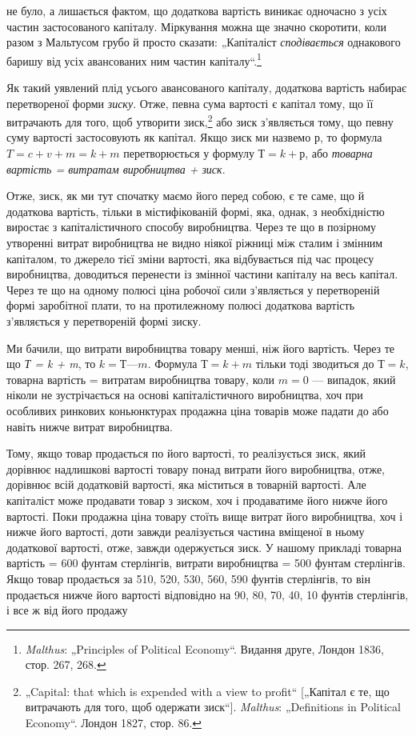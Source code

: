 \parcont{}  %
не було, а лишається фактом, що додаткова вартість виникає одночасно
з усіх частин застосованого капіталу. Міркування можна
ще значно скоротити, коли разом з Мальтусом грубо й просто
сказати: „Капіталіст \emph{сподівається} однакового баришу від усіх
авансованих ним частин капіталу“.\footnote{
\emph{Malthus}: „Principles of Political Economy“. Видання друге, Лондон 1836,
стор. 267, 268.
}

Як такий уявлений плід усього авансованого капіталу, додаткова
вартість набирає перетвореної форми \emph{зиску}. Отже, певна
сума вартості є капітал тому, що її витрачають для того, щоб
утворити зиск,\footnote{
„Capital: that which is expended with a view to profit“ [„Капітал є те, що
витрачають для того, щоб одержати зиск“]. \emph{Malthus}: „Definitions in Political
Economy“. Лондон 1827, стор. 86.
} або зиск з’являється тому, що певну суму вартості
застосовують як капітал. Якщо зиск ми назвемо $р$, то формула
$T = c + v + m = k + m$ перетворюється у формулу $Т = k + р$, або
\emph{товарна вартість = витратам виробництва + зиск}.

Отже, зиск, як ми тут спочатку маємо його перед собою,
є те саме, що й додаткова вартість, тільки в містифікованій
формі, яка, однак, з необхідністю виростає з капіталістичного
способу виробництва. Через те що в позірному утворенні витрат
виробництва не видно ніякої ріжниці між сталим і змінним
капіталом, то джерело тієї зміни вартості, яка відбувається
під час процесу виробництва, доводиться перенести із змінної
частини капіталу на весь капітал. Через те що на одному полюсі
ціна робочої сили з’являється у перетвореній формі заробітної
плати, то на протилежному полюсі додаткова вартість з’являється
у перетвореній формі зиску.

Ми бачили, що витрати виробництва товару менші, ніж його
вартість. Через те що \emph{Т = k + m}, то $k = Т — m$. Формула
$Т = k + m$ тільки тоді зводиться до $Т = k$, товарна вартість =
витратам виробництва товару, коли $m = 0$ — випадок, який
ніколи не зустрічається на основі капіталістичного виробництва,
хоч при особливих ринкових коньюнктурах продажна ціна товарів
може падати до або навіть нижче витрат виробництва.

Тому, якщо товар продається по його вартості, то реалізується
зиск, який дорівнює надлишкові вартості товару понад витрати
його виробництва, отже, дорівнює всій додатковій вартості, яка
міститься в товарній вартості. Але капіталіст може продавати
товар з зиском, хоч і продаватиме його нижче його вартості.
Поки продажна ціна товару стоїть вище витрат його виробництва,
хоч і нижче його вартості, доти завжди реалізується
частина вміщеної в ньому додаткової вартості, отже, завжди
одержується зиск. У нашому прикладі товарна вартість = 600
фунтам стерлінгів, витрати виробництва = 500 фунтам стерлінгів.
Якщо товар продається за 510, 520, 530, 560, 590 фунтів
стерлінгів, то він продається нижче його вартості відповідно на
90, 80, 70, 40, 10 фунтів стерлінгів, і все ж від його продажу
\parbreak{}  %
